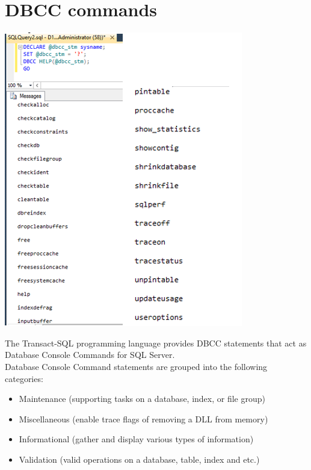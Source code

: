 \documentclass[english]{article}
\begin{document}
\section{DBCC commands}
\centerline{\includegraphics[scale=0.8]{administration/rep/15}}

The Transact-SQL programming language provides DBCC statements that act as Database Console Commands for SQL Server.\\

Database Console Command statements are grouped into the following categories:
\begin{itemize}
\item Maintenance (supporting tasks on a database, index, or file group)
\item Miscellaneous (enable trace flags of removing a DLL from memory)
\item Informational (gather and display various types of information)
\item Validation (valid operations on a database, table, index and etc.)
\end{itemize}
\end{document}
